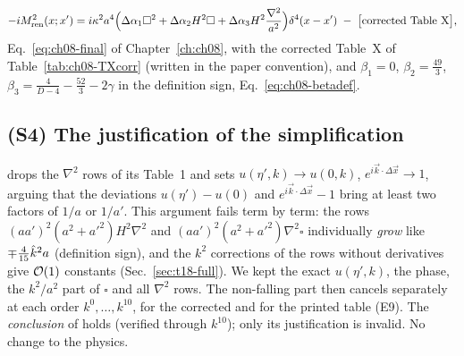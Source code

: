 \begin{resultbox}
\[
-iM^2_{\rm ren}(x;x')=i\kappa^2a^4\Big(\Delta\alpha_1\square^2+\Delta\alpha_2H^2\square+\Delta\alpha_3H^2\frac{\nabla^2}{a^2}\Big)\delta^4(x-x')
\;-\;\big[\text{corrected Table X}\big],
\]
Eq.~\eqref{eq:ch08-final} of Chapter~\ref{ch:ch08}, with the corrected Table~X of Table~\ref{tab:ch08-TXcorr} (written in the paper convention), and
$\beta_1=0$, $\beta_2=\tfrac{49}{3}$, $\beta_3=\tfrac{4}{D-4}-\tfrac{52}{3}-2\gamma$ in the definition sign, Eq.~\eqref{eq:ch08-betadef}.
\end{resultbox}

\subsection*{(S4) The justification of the simplification }
\begin{discbox}
\PII{} drops the $\nabla^2$ rows of its Table~1 and sets $u(\eta',k)\to u(0,k)$, $e^{i\vec k\cdot\Delta\vec x}\to1$, arguing that the deviations
$u(\eta')-u(0)$ and $e^{i\vec k\cdot\Delta\vec x}-1$ bring at least two factors of $1/a$ or $1/a'$. This argument fails term by term: the rows
$(aa')^2(a^2+a'^2)H^2\nabla^2$ and $(aa')^2(a^2+a'^2)\nabla^2\square$ individually \emph{grow} like $\mp\tfrac{4}{15}\hat k^2a$ (definition sign), and the
$k^2$ corrections of the rows without derivatives give $\mathcal{O}\!\left(1\right)$ constants (Sec.~\ref{sec:t18-full}). We kept the exact $u(\eta',k)$, the phase, the
$k^2/a^2$ part of $\square$ and all $\nabla^2$ rows. The non-falling part then cancels separately at each order $k^0,\dots,k^{10}$, for the corrected and
for the printed table (E9). The \emph{conclusion} of  holds (verified through $k^{10}$); only its justification is invalid. No change to the
physics.
\end{discbox}

